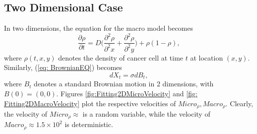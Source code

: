 \documentclass[10pt]{article}
\begin{document}
\subsection{Two Dimensional Case}

In two dimensions, the equation for the macro model becomes 
\begin{equation}
\frac{\partial \rho}{\partial t} = D\Big(\frac{\partial^2 \rho}{\partial^2 x} + \frac{\partial^2 \rho}{\partial^2 y}\Big) + \rho(1-\rho),
\label{eq: Macro2D}
\end{equation}
where $\rho(t,x,y)$ denotes the density of cancer cell at time $t$ at location $(x,y).$ Similarly, (\ref{eq: BrownianEQ}) becomes 
\begin{equation}
dX_t = \sigma dB_t,
\label{eq: MicroModel2}
\end{equation}
where $B_t$ denotes a standard Brownian motion in 2 dimensions, with $B(0) = (0,0)$.  Figures \ref{fig:Fitting2DMicroVelocity} and \ref{fig: Fitting2DMacroVelocity}
plot the respective velocities of $Micro_{\rho}, Macro_{\rho}$.  Clearly, the velocity of $Micro_{\rho} \approx $ is a random variable, while the velocity of $Macro_{\rho}\approx 1.5 \times 10^2$ is deterministic. 
\end{document}
